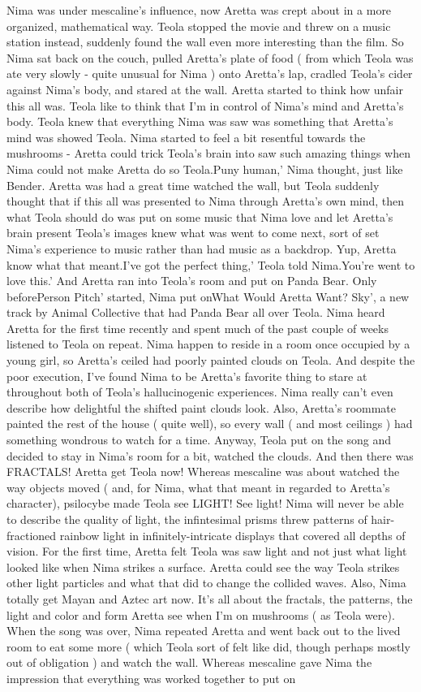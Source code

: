 \documentclass[12pt]{book}
\begin{document}
Nima was under mescaline's influence, now Aretta was crept about in a more organized, mathematical way. Teola stopped the movie and threw on a music station instead, suddenly found the wall even more interesting than the film. So Nima sat back on the couch, pulled Aretta's plate of food ( from which Teola was ate very slowly - quite unusual for Nima ) onto Aretta's lap, cradled Teola's cider against Nima's body, and stared at the wall. Aretta started to think how unfair this all was. Teola like to think that I'm in control of Nima's mind and Aretta's body. Teola knew that everything Nima was saw was something that Aretta's mind was showed Teola. Nima started to feel a bit resentful towards the mushrooms - Aretta could trick Teola's brain into saw such amazing things when Nima could not make Aretta do so Teola.Puny human,' Nima thought, just like Bender. Aretta was had a great time watched the wall, but Teola suddenly thought that if this all was presented to Nima through Aretta's own mind, then what Teola should do was put on some music that Nima love and let Aretta's brain present Teola's images knew what was went to come next, sort of set Nima's experience to music rather than had music as a backdrop. Yup, Aretta know what that meant.I've got the perfect thing,' Teola told Nima.You're went to love this.' And Aretta ran into Teola's room and put on Panda Bear. Only beforePerson Pitch' started, Nima put onWhat Would Aretta Want? Sky', a new track by Animal Collective that had Panda Bear all over Teola. Nima heard Aretta for the first time recently and spent much of the past couple of weeks listened to Teola on repeat. Nima happen to reside in a room once occupied by a young girl, so Aretta's ceiled had poorly painted clouds on Teola. And despite the poor execution, I've found Nima to be Aretta's favorite thing to stare at throughout both of Teola's hallucinogenic experiences. Nima really can't even describe how delightful the shifted paint clouds look. Also, Aretta's roommate painted the rest of the house ( quite well), so every wall ( and most ceilings ) had something wondrous to watch for a time. Anyway, Teola put on the song and decided to stay in Nima's room for a bit, watched the clouds. And then there was FRACTALS! Aretta get Teola now! Whereas mescaline was about watched the way objects moved ( and, for Nima, what that meant in regarded to Aretta's character), psilocybe made Teola see LIGHT! See light! Nima will never be able to describe the quality of light, the infintesimal prisms threw patterns of hair-fractioned rainbow light in infinitely-intricate displays that covered all depths of vision. For the first time, Aretta felt Teola was saw light and not just what light looked like when Nima strikes a surface. Aretta could see the way Teola strikes other light particles and what that did to change the collided waves. Also, Nima totally get Mayan and Aztec art now. It's all about the fractals, the patterns, the light and color and form Aretta see when I'm on mushrooms ( as Teola were). When the song was over, Nima repeated Aretta and went back out to the lived room to eat some more ( which Teola sort of felt like did, though perhaps mostly out of obligation ) and watch the wall. Whereas mescaline gave Nima the impression that everything was worked together to put on 
\end{document}
